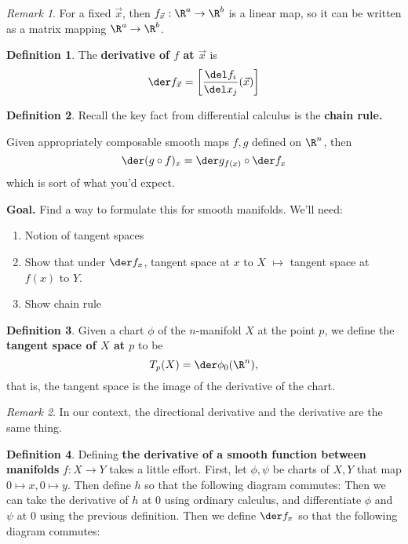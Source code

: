 \documentclass[a5paper]{article}
\theoremstyle{definition}%
\newtheorem*{definition*}{Definition}
\numberwithin{exercise}{section}
\theoremstyle{remark}%
\newtheorem*{remark*}{Remark}
\renewcommand{\emph}{\textbf}
\begin{document}
\begin{remark*}
For a fixed ${\vec{x}}$, then $f_{\vec{x}}:\R^a\to \R^b$ is a linear map, so it can be written as a matrix mapping $\R^a\to \R^b$. 
\end{remark*}

\begin{definition*}
The \emph{derivative of $f$ at $\vec{x}$} is 
$$\der f_{\vec{x}} = \left[ \frac{\del f_i}{\del x_j}(\vec{x})\right]$$
\end{definition*}

\begin{highlight}
\begin{definition*}
Recall the key fact from differential calculus is the \emph{chain rule.}

Given appropriately composable smooth maps $f,g$ defined on $\R^n$, then 
$$\der(g\circ	f)_x = \der g_{f(x)} \circ \der f_x$$
which is sort of what you'd expect.
\end{definition*}
\end{highlight}

\noindent\textbf{Goal.} Find a way to formulate this for smooth manifolds. We'll need:
\begin{enumerate}
\item Notion of tangent spaces
\item Show that under $\der f_x$, tangent space at $x$ to $X$ $\mapsto$ tangent space at $f(x)$ to $Y$. 
\item Show chain rule
\end{enumerate}

\begin{highlight}
\begin{definition*}
Given a chart $\phi$ of the $n$-manifold $X$ at the point $p$, we define the \emph{tangent space of 
$X$ at $p$} to be 
$$T_p(X)=\der\phi_0(\R^n),$$
that is, the tangent space is the image of the derivative of the chart. 
\end{definition*}
\end{highlight}
\begin{remark*}
In our context, the directional derivative and the derivative are the same thing. 
\end{remark*}

\begin{highlight}
\begin{definition*}
Defining \emph{the derivative of a smooth function between manifolds} $f:X\to Y$ takes a little effort. First, let $\phi,\psi$ be charts of $X,Y$ that map $0\mapsto x, 0\mapsto y$. Then define $h$ so that the following diagram commutes:
Then we can take the derivative of $h$ at 0 using ordinary calculus, and differentiate $\phi$ and $\psi$ at 0 using the previous definition. Then we define $\der f_x$ so that the following diagram commutes:
\end{definition*}
\end{highlight}
\end{document}
